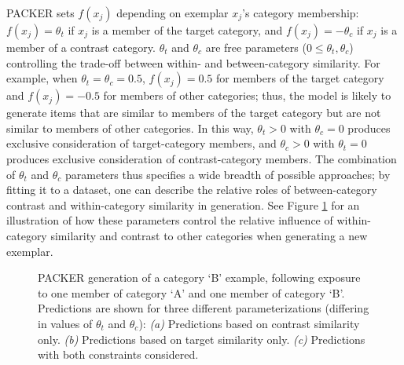 \documentclass[12pt]{article}
\newcommand\inputpgf[2]{{
\let\pgfimageWithoutPath\pgfimage
\renewcommand{\pgfimage}[2][]{\pgfimageWithoutPath[##1]{#1/##2}}

}}
\begin{document}
\begin{flushleft}
PACKER sets $f(x_j)$ depending on exemplar $x_j$'s category membership:
$f(x_j) = \theta_t$ if $x_j$ is a member of the target category, and
$f(x_j) = -\theta_c$ if $x_j$ is a member of a contrast category. $\theta_t$ and
$\theta_c$ are free parameters ($0 \leq \theta_t,\theta_c$) controlling the
trade-off between within- and between-category similarity. For example, when
$\theta_t = \theta_c = 0.5$, $f(x_j) = 0.5$ for members of the target category
and $f(x_j) = -0.5$ for members of other categories; thus, the model is likely
to generate items that are similar to members of the target category but are not
similar to members of other categories. In this way, $\theta_t > 0$ with
$\theta_c = 0$ produces exclusive consideration of target-category members, and
$\theta_c > 0$ with $\theta_t = 0$ produces exclusive consideration of
contrast-category members. The combination of $\theta_t$ and $\theta_c$
parameters thus specifies a wide breadth of possible approaches; by fitting it
to a dataset, one can describe the relative roles of between-category contrast
and within-category similarity in generation. See Figure
\ref{fig:packer-examples} for an illustration of how these parameters control
the relative influence of within-category similarity and contrast to other
categories when generating a new exemplar.

\begin{figure}
	\begin{center} \inputpgf{figs/}{packer-examples.pgf}
      \caption{PACKER generation of a category `B' example, following exposure
        to one member of category `A' and one member of category `B'.
        Predictions are shown for three different parameterizations (differing
        in values of $\theta_t$ and $\theta_c$): {\em (a)}
        Predictions based on contrast similarity only. {\em (b)}
        Predictions based on target similarity only. {\em (c)} Predictions with
        both constraints considered.}
		\label{fig:packer-examples}
	\end{center}
\end{figure}


\end{flushleft}
\end{document}
